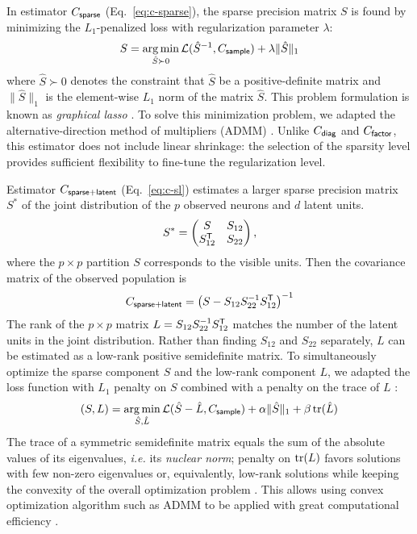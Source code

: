 In estimator $C_{\sf sparse}$ (Eq.~\ref{eq:c-sparse}), the sparse precision matrix $S$ is found by minimizing the $L_1$-penalized loss with regularization parameter $\lambda$:
\begin{equation}
S = \operatorname*{arg\,min}\limits_{\hat S \succ 0} \mathcal L({\hat S}^{-1},C_{\sf sample}) + \lambda \|\hat S \|_1
\end{equation}
where $\hat S\succ 0$ denotes the constraint that $\hat S$ be a positive-definite matrix and $\|\hat S\|_1$ is the element-wise $L_1$ norm of the matrix $\hat S$. This problem formulation is known as \emph{graphical lasso} \cite{Meinshausen:2006, Friedman:2008}. To solve this minimization problem, we adapted the alternative-direction method of multipliers (ADMM) \cite{Ma:2013}.
Unlike $C_{\sf diag}$ and $C_{\sf factor}$, this estimator does not include linear shrinkage: the selection of the sparsity level provides sufficient flexibility to fine-tune the regularization level.

Estimator $C_{\sf sparse+latent}$ (Eq.~\ref{eq:c-sl}) estimates a larger sparse precision matrix $S^\ast$ of the joint distribution of the $p$ observed neurons and $d$ latent units.
\begin{equation}
S^\ast=
\begin{pmatrix}
S & S_{12} \\
S_{12}^{\sf T} & S_{22}
\end{pmatrix},
\end{equation}
where the $p\times p$ partition $S$ corresponds to the visible units.
Then the covariance matrix of the observed population is
\begin{equation}
C_{\sf sparse+latent} = \left(S-S_{12}S_{22}^{-1}S_{12}^{\sf T}\right)^{-1}
\end{equation}
The rank of the $p\times p$  matrix $L=S_{12}S_{22}^{-1}S_{12}^{\sf T}$ matches the number of the latent units in the joint distribution. Rather than finding $S_{12}$ and $S_{22}$ separately, $L$ can be estimated as a low-rank positive semidefinite matrix. To simultaneously optimize the sparse component $S$ and the low-rank component $L$, we adapted the loss function with $L_1$ penalty on $S$ combined with a penalty on the trace of $L$ \cite{Chandrasekaran:2010,Ma:2013}:
\begin{equation}\label{eq:ma}
(S,L) = \operatorname*{arg\,min}\limits_{\hat S,\hat L} \mathcal L(\hat S-\hat L, C_{\sf sample}) + \alpha\|\hat S\|_1 + \beta\operatorname{tr}(\hat L)
\end{equation}
The trace of a symmetric semidefinite matrix equals the sum of the absolute values of its eigenvalues, \emph{i.e.} its \emph{nuclear norm}; penalty on $\operatorname{tr}(L)$ favors solutions with few non-zero eigenvalues or, equivalently, low-rank solutions while keeping the convexity of the overall optimization problem \cite{Fazel:2002,Recht:2010}. This allows using convex optimization algorithm such as ADMM to be applied with great computational efficiency \cite{Ma:2013}.

